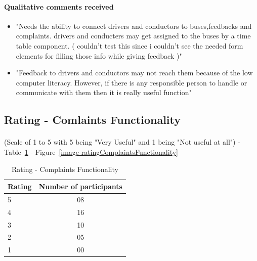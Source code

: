 \paragraph{Qualitative comments received}
\begin {itemize}
\item "Needs the ability to connect drivers and conductors to buses,feedbacks and complaints. drivers and conducters may get assigned to the buses by a time table component. ( couldn't test this since i couldn't see the needed form elements for filling those info while giving feedback )"
\item "Feedback to drivers and conductors may not reach them because of the low computer literacy. However, if there is any responsible person to handle or communicate with them then it is really useful function"
\end {itemize}



\subsection{Rating - Comlaints Functionality}

\paragraph{} (Scale of 1 to 5 with 5 being "Very Useful" and 1 being "Not useful at all") - Table~\ref{table-survey-rating-ComplaintsFunctionality} - Figure~\ref{image-ratingComplaintsFunctionality}

\begin{table} [H]
\centering
\begin{tabular}{|l|c|}
\hline
Rating & Number of participants \\
\hline
5	&08 \\
4	&16 \\
3	&10 \\
2	&05 \\
1	&00 \\
\hline
\end{tabular}
\caption{Rating - Complaints Functionality}
\label{table-survey-rating-ComplaintsFunctionality}
\end{table}

